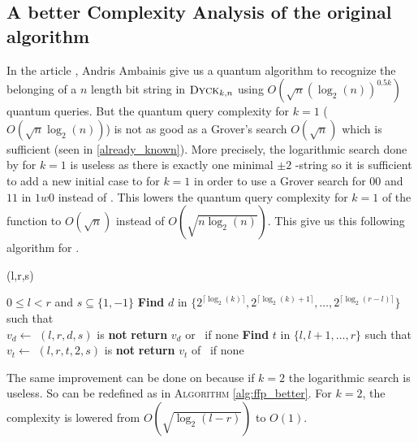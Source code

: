 \subsection{A better Complexity Analysis of the original algorithm}

In the article \cite{art:2DGrid}, Andris Ambainis give us a quantum algorithm to recognize
the belonging of a $n$ length bit string in $\textsc{Dyck$_{k, n}$}$ using
$O(\sqrt{n}(\log_2(n))^{0.5k})$ quantum queries. But the quantum query complexity for
$k=1$ ($O(\sqrt{n}\log_2(n))$) is not as good as a
Grover's search $O(\sqrt{n})$ which is sufficient (seen in \autoref{already_known}).
More precisely, the logarithmic search done by  for $k=1$ is useless
as there is exactly one minimal $\pm 2$ -string so it is sufficient to
add a new initial case to  for $k = 1$ in order to use a Grover search
for $00$ and $11$ in $1w0$ instead of . This lowers the quantum query
complexity for $k=1$ of the function to $O(\sqrt{n})$ instead of $O(\sqrt{n\log_2(n)})$.
This give us this following algorithm for .

\begin{algorithm}
    \caption{(l,r,s)}\label{alg:FA_prim}
    \begin{algorithmic}
        \Require $0 \leq l < r$ and $s \subseteq \{1,-1\}$
        \State \textbf{Find} $d$ in $\{2^{\lceil \log_2(k)\rceil }, 2^{\lceil \log_2(k)+1\rceil },\ldots,2^{\lceil \log_2(r-l)\rceil }\}$
        such that \\
        \hspace*{1cm} $v_d \gets $ $(l,r,d,s)$ is \textbf{not} \Null
        \State \textbf{return} $v_d$ or \Null \ if none
        \Else
        \State \textbf{Find} $t$ in $\{l, l+1, \dots, r\}$ such that \\
        \hspace*{1cm} $v_t \gets$ $(l,r,t,2,s)$ is \textbf{not} \Null
        \State \textbf{return} $v_t$ of \Null \ if none
        \EndIf
    \end{algorithmic}
\end{algorithm}

The same improvement can be done on  because if $k = 2$ the logarithmic
search is useless. So  can be redefined as in \textsc{Algorithm} \autoref{alg:ffp_better}.
For $k=2$, the complexity is lowered from $O(\sqrt{\log_2(l-r)})$ to $O(1)$.

